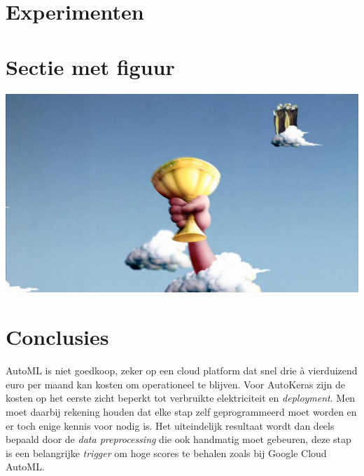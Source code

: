 \documentclass[a0,portrait]{a0poster}
\begin{document}
\begin{multicols}{2}
\color{Black} %
\color{HoGentAccent1} 
\section*{Experimenten}
\color{black}


\color{HoGentAccent1} 
\section*{Sectie met figuur}
\color{black}

\begin{center}\vspace{1cm}
\includegraphics[width=1.0\linewidth]{grail}
\end{center}\vspace{1cm}




\color{HoGentAccent1} 
\section*{Conclusies}
\color{black}

AutoML is niet goedkoop, zeker op een cloud platform dat snel drie à vierduizend euro per maand kan kosten om operationeel te blijven. Voor AutoKeras zijn de kosten op het eerste zicht beperkt tot verbruikte elektriciteit en \textit{deployment}. Men moet daarbij rekening houden dat elke stap zelf geprogrammeerd moet worden en er toch enige kennis voor nodig is. Het uiteindelijk resultaat wordt dan deels bepaald door de \textit{data preprocessing} die ook handmatig moet gebeuren, deze stap is een belangrijke \textit{trigger} om hoge scores te behalen zoals bij Google Cloud AutoML.


\end{multicols}
\end{document}
